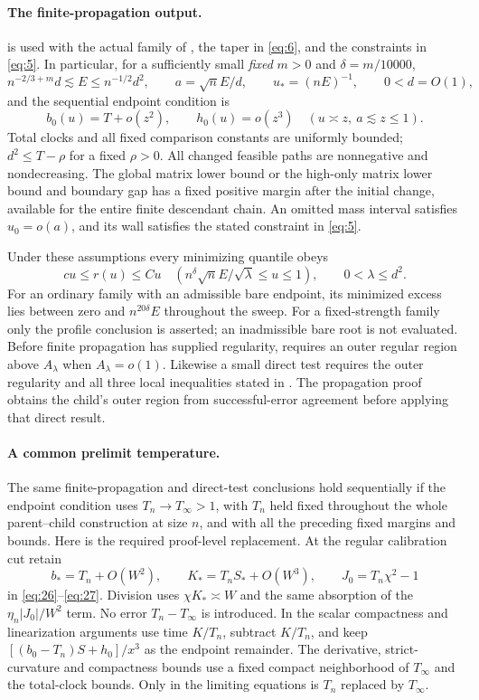 \paragraph{The finite-propagation output.}
 is used with the actual family of
, the taper in \eqref{eq:6}, and the constraints
in \eqref{eq:5}. In particular, for a sufficiently small \emph{fixed}
$m>0$ and $\delta=m/10000$,
\[
 n^{-2/3+m}d\lesssim E\le n^{-1/2}d^2,\qquad
 a=\sqrt n E/d,\qquad u_*=(nE)^{-1},\qquad 0<d=O(1),
\]
and the sequential endpoint condition is
\[
 b_0(u)=T+o(z^2),\qquad h_0(u)=o(z^3)
 \quad (u\asymp z,\ a\lesssim z\le1).
\]
Total clocks and all fixed comparison constants are uniformly bounded;
$d^2\le T-\rho$ for a fixed $\rho>0$. All changed feasible paths
are nonnegative and nondecreasing. The global matrix lower bound or
the high-only matrix lower bound and boundary gap has a fixed positive
margin after the initial change, available for the entire finite
descendant chain. An omitted mass interval satisfies $u_0=o(a)$,
and its wall satisfies the stated constraint in \eqref{eq:5}.

Under these assumptions every minimizing quantile obeys
\[
 cu\le r(u)\le Cu
 \quad\left(n^\delta\sqrt n E/\sqrt\lambda\le u\le1\right),
 \qquad 0<\lambda\le d^2.
\]
For an ordinary family with an admissible bare endpoint, its minimized
excess lies between zero and $n^{20\delta}E$ throughout the sweep.
For a fixed-strength family only the profile conclusion is asserted;
an inadmissible bare root is not evaluated. Before finite propagation
has supplied regularity,  requires an
outer regular region above $A_\lambda$ when $A_\lambda=o(1)$.
Likewise a small direct test requires the outer regularity and all
three local inequalities stated in .
The propagation proof obtains the child's outer region from
successful-error agreement before applying that direct result.

\paragraph{A common prelimit temperature.}
The same finite-propagation and direct-test conclusions hold
sequentially if the endpoint condition uses $T_n\to T_\infty>1$,
with $T_n$ held fixed throughout the whole parent--child construction
at size $n$, and with all the preceding fixed margins and bounds.
Here is the required proof-level replacement. At the regular
calibration cut retain
\[
 b_*=T_n+O(W^2),\qquad K_*=T_nS_*+O(W^3),\qquad
 J_0=T_n\chi^2-1
\]
in \eqref{eq:26}--\eqref{eq:27}. Division uses
$\chi K_*\asymp W$ and the same absorption of the
$\eta_n|J_0|/W^2$ term. No error $T_n-T_\infty$ is introduced.
In the scalar compactness and linearization arguments use time
$K/T_n$, subtract $K/T_n$, and keep
$[(b_0-T_n)S+h_0]/x^3$ as the endpoint remainder. The derivative,
strict-curvature and compactness bounds use a fixed compact
neighborhood of $T_\infty$ and the total-clock bounds. Only in the
limiting equations is $T_n$ replaced by $T_\infty$.

